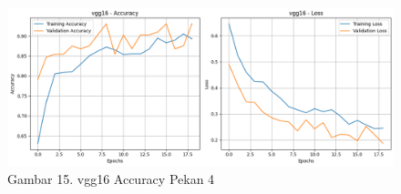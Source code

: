 \documentclass[12pt,a4paper]{article}
\begin{document}
\begin{adjustwidth}{3em}{0pt}
\begin{figure}[H]
    \centering
    \includegraphics[width=1\linewidth]{Images/akurasipekan4vgg.png}
    \caption*{Gambar 15.  vgg16 Accuracy Pekan 4}
    \label{fig:dataset_collection}
\end{figure}

\end{adjustwidth}
\end{document}
